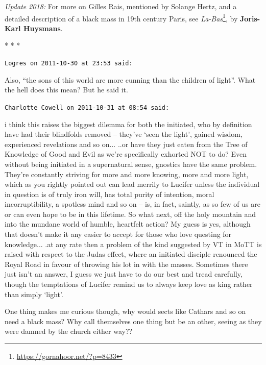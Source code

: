 \textit{Update 2018:} For more on Gilles Rais, mentioned by Solange Hertz, and a detailed description of a black mass in 19th century Paris, see \emph{La-Bas}\footnote{\url{https://gornahoor.net/?p=8433}}, by \textbf{Joris-Karl Huysmans}.




\begin{center}* * *\end{center}

\begin{footnotesize}
\begin{sffamily}
\texttt{Logres on 2011-10-30 at 23:53 said:}

Also, ``the sons of this world are more cunning than the children of light''. What the hell does this mean? But he said it.

\hfill

\texttt{Charlotte Cowell on 2011-10-31 at 08:54 said:}

i think this raises the biggest dilemma for both the initiated, who by definition have had their blindfolds removed -- they've `seen the light', gained wisdom, experienced revelations and so on... ..or have they just eaten from the Tree of Knowledge of Good and Evil as we're specifically exhorted NOT to do? Even without being initiated in a supernatural sense, gnostics have the same problem. They're constantly striving for more and more knowing, more and more light, which as you rightly pointed out can lead merrily to Lucifer unless the individual in question is of truly iron will, has total purity of intention, moral incorruptibility, a spotless mind and so on -- is, in fact, saintly, as so few of us are or can even hope to be in this lifetime. So what next, off the holy mountain and into the mundane world of humble, heartfelt action? My guess is yes, although that doesn't make it any easier to accept for those who love questing for knowledge... .at any rate then a problem of the kind suggested by VT in MoTT is raised with respect to the Judas effect, where an initiated disciple renounced the Royal Road in favour of throwing his lot in with the masses. Sometimes there just isn't an answer, I guess we just have to do our best and tread carefully, though the temptations of Lucifer remind us to always keep love as king rather than simply `light'.

One thing makes me curious though, why would sects like Cathars and so on need a black mass? Why call themselves one thing but be an other, seeing as they were damned by the church either way??


\end{sffamily}
\end{footnotesize}
